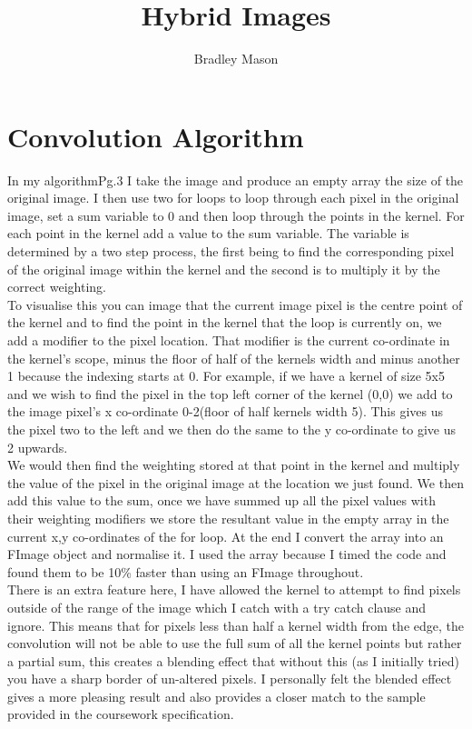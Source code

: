 \documentclass{article}
\begin{document}
	\title{Hybrid Images}
	\author{Bradley Mason}
	\maketitle
	
	\section*{Convolution Algorithm}
	In my algorithm{\tiny Pg.3} I take the image and produce an empty array the size of the original image. I then use two for loops to loop through each pixel in the original image, set a sum variable to 0 and then loop through the points in the kernel. For each point in the kernel add a value to the sum variable. The variable is determined by a two step process, the first being to find the corresponding pixel of the original image within the kernel and the second is to multiply it by the correct weighting.
	\\
	To visualise this you can image that the current image pixel is the centre point of the kernel and to find the point in the kernel that the loop is currently on, we add a modifier to the pixel location. That modifier is the current co-ordinate in the kernel’s scope, minus the floor of half of the kernels width and minus another 1 because the indexing starts at 0. For example, if we have a kernel of size 5x5 and we wish to find the pixel in the top left corner of the kernel (0,0) we add to the image pixel’s x co-ordinate 0-2(floor of half kernels width 5). This gives us the pixel two to the left and we then do the same to the y co-ordinate to give us 2 upwards.\\
	We would then find the weighting stored at that point in the kernel and multiply the value of the pixel in the original image at the location we just found. We then add this value to the sum, once we have summed up all the pixel values with their weighting modifiers we store the resultant value in the empty array in the current x,y co-ordinates of the for loop. At the end I convert the array into an FImage object and normalise it. I used the array because I timed the code and found them to be 10\% faster than using an FImage throughout.\\
	There is an extra feature here, I have allowed the kernel to attempt to find pixels outside of the range of the image which I catch with a try catch clause and ignore. This means that for pixels less than half a kernel width from the edge, the convolution will not be able to use the full sum of all the kernel points but rather a partial sum, this creates a blending effect that without this (as I initially tried) you have a sharp border of un-altered pixels. I personally felt the blended effect gives a more pleasing result and also provides a closer match to the sample provided in the coursework specification.
	
\end{document}
